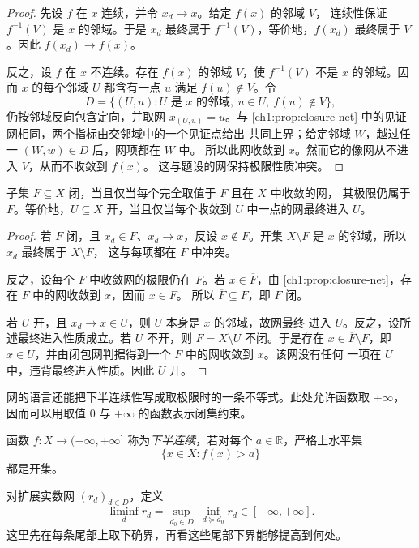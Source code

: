 \begin{proof}
先设 \(f\) 在 \(x\) 连续，并令 \(x_d\to x\)。给定 \(f(x)\) 的邻域 \(V\)，
连续性保证 \(f^{-1}(V)\) 是 \(x\) 的邻域。于是 \(x_d\) 最终属于
\(f^{-1}(V)\)，等价地，\(f(x_d)\) 最终属于 \(V\)。因此
\(f(x_d)\to f(x)\)。

反之，设 \(f\) 在 \(x\) 不连续。存在 \(f(x)\) 的邻域 \(V\)，使
\(f^{-1}(V)\) 不是 \(x\) 的邻域。因而 \(x\) 的每个邻域 \(U\) 都含有一点
\(u\) 满足 \(f(u)\notin V\)。令
\[
 D=\{(U,u):U\text{ 是 }x\text{ 的邻域},\ u\in U,\ f(u)\notin V\},
\]
仍按邻域反向包含定向，并取网 \(x_{(U,u)}=u\)。与
\cref{ch1:prop:closure-net} 中的见证网相同，两个指标由交邻域中的一个见证点给出
共同上界；给定邻域 \(W\)，越过任一 \((W,w)\in D\) 后，网项都在 \(W\) 中。
所以此网收敛到 \(x\)。然而它的像网从不进入 \(V\)，从而不收敛到 \(f(x)\)。
这与题设的网保持极限性质冲突。
\end{proof}

\begin{proposition}[开闭集的纯收敛刻画]
子集 \(F\subseteq X\) 闭，当且仅当每个完全取值于 \(F\) 且在 \(X\) 中收敛的网，
其极限仍属于 \(F\)。等价地，\(U\subseteq X\) 开，当且仅当每个收敛到
\(U\) 中一点的网最终进入 \(U\)。
\label{ch1:prop:open-closed-net}
\end{proposition}

\begin{proof}
若 \(F\) 闭，且 \(x_d\in F\)、\(x_d\to x\)，反设 \(x\notin F\)。开集
\(X\setminus F\) 是 \(x\) 的邻域，所以 \(x_d\) 最终属于 \(X\setminus F\)，
这与每项都在 \(F\) 中冲突。

反之，设每个 \(F\) 中收敛网的极限仍在 \(F\)。若 \(x\in\overline F\)，由
\cref{ch1:prop:closure-net}，存在 \(F\) 中的网收敛到 \(x\)，因而 \(x\in F\)。
所以 \(\overline F\subseteq F\)，即 \(F\) 闭。

若 \(U\) 开，且 \(x_d\to x\in U\)，则 \(U\) 本身是 \(x\) 的邻域，故网最终
进入 \(U\)。反之，设所述最终进入性质成立。若 \(U\) 不开，则
\(F=X\setminus U\) 不闭。于是存在 \(x\in\overline F\setminus F\)，即
\(x\in U\)，并由闭包网判据得到一个 \(F\) 中的网收敛到 \(x\)。该网没有任何
一项在 \(U\) 中，违背最终进入性质。因此 \(U\) 开。
\end{proof}

网的语言还能把下半连续性写成取极限时的一条不等式。此处允许函数取
\(+\infty\)，因而可以用取值 $0$ 与 $+\infty$ 的函数表示闭集约束。

\begin{definition}[拓扑下半连续与网的下极限]
函数 \(f\colon X\to(-\infty,+\infty]\) 称为\emph{下半连续}，若对每个
\(a\in\mathbb R\)，严格上水平集
\[
 \{x\in X:f(x)>a\}
\]
都是开集。

对扩展实数网 \((r_d)_{d\in D}\)，定义
\[
 \liminf_d r_d
 =\sup_{d_0\in D}\ \inf_{d\succeq d_0}r_d
 \in[-\infty,+\infty].
\]
这里先在每条尾部上取下确界，再看这些尾部下界能够提高到何处。
\end{definition}

